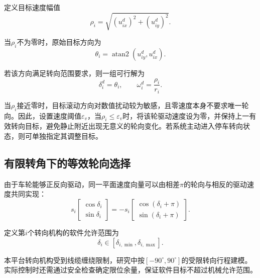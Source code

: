 \documentclass[UTF8,12pt,a4paper,openany]{ctexbook}
\begin{document}
定义目标速度幅值
\begin{equation}
    \rho_i
    =
    \sqrt{
        (u_{ix}^{d})^2+(u_{iy}^{d})^2
    }.
    \label{eq:kc-speed-magnitude}
\end{equation}

当$\rho_i$不为零时，原始目标方向为
\begin{equation}
    \theta_i
    =
    \operatorname{atan2}
    \left(
        u_{iy}^{d},u_{ix}^{d}
    \right).
    \label{eq:kc-raw-angle}
\end{equation}

若该方向满足转向范围要求，则一组可行解为
\begin{equation}
    \delta_i^{d}=\theta_i,
    \qquad
    \omega_i^{d}=\frac{\rho_i}{r_i}.
    \label{eq:kc-basic-inverse}
\end{equation}

当$\rho_i$接近零时，目标滚动方向对数值扰动较为敏感，且零速度本身不要求唯一轮向。因此，设置速度阈值$\varepsilon_v$，当$\rho_i\leq\varepsilon_v$时，将该轮驱动速度设为零，并保持上一有效转向目标，避免静止附近出现无意义的轮向变化。若系统主动进入停车转向状态，则可单独指定其调整目标。

\subsection{有限转角下的等效轮向选择}

由于车轮能够正反向驱动，同一平面速度向量可以由相差$\pi$的轮向与相反的驱动速度共同实现：
\begin{equation}
    s_i
    \begin{bmatrix}
        \cos\delta_i\\
        \sin\delta_i
    \end{bmatrix}
    =
    -s_i
    \begin{bmatrix}
        \cos(\delta_i+\pi)\\
        \sin(\delta_i+\pi)
    \end{bmatrix}.
    \label{eq:kc-equivalent-direction}
\end{equation}

定义第$i$个转向机构的软件允许范围为
\begin{equation}
    \delta_i\in
    [\delta_{i,\min},\delta_{i,\max}].
    \label{eq:kc-steering-limit}
\end{equation}

本平台转向机构受到线缆缠绕限制，研究中按$[-90^\circ,90^\circ]$的受限转向行程建模。实际控制时还需通过安全检查确定限位余量，保证软件目标不超过机械允许范围。
\end{document}
